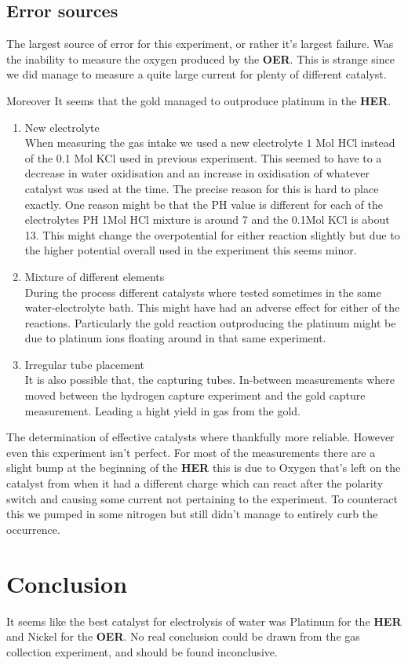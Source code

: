 \documentclass[twocolumn, floatfix]{revtex4-2}
\begin{document}
\subsection{Error sources}
The largest source of error for this experiment, or rather it's largest failure. Was 
the inability to measure the oxygen produced by the \textbf{OER}. This is strange 
since we did manage to measure a quite large current for plenty of different catalyst.
\par
Moreover It seems that the gold managed to outproduce platinum in the \textbf{HER}.
\begin{enumerate}
	\item New electrolyte \\
		When measuring the gas intake we used a new electrolyte $1$ Mol HCl instead of the
		0.1 Mol KCl used in previous experiment. This seemed to have to a decrease in water oxidisation
		and an increase in oxidisation of whatever catalyst was used at the time. The precise
		reason for this is hard to place exactly. One reason might be that the PH value is 
		different for each of the electrolytes PH 1Mol HCl mixture is around 7 and the 0.1Mol KCl
		is about 13. This might change the overpotential for either reaction slightly but due 
		to the higher potential overall used in the experiment this seems minor.
	\item Mixture of different elements \\
		During the process different catalysts where tested sometimes in the same 
		water-electrolyte bath. This might have had an adverse effect for either of 
		the reactions. Particularly the gold reaction outproducing the platinum might
		be due to platinum ions floating around in that same experiment.
	\item Irregular tube placement\\
		It is also possible that, the capturing tubes. In-between measurements where moved
		between the hydrogen capture experiment and the gold capture measurement. Leading 
		a hight yield in gas from the gold.
\end{enumerate}

The determination of effective catalysts where thankfully more reliable. However even this experiment
isn't perfect. 
For most of the measurements there are a slight bump at the beginning of the \textbf{HER} this is due to
Oxygen that's left on the catalyst from when it had a different charge which can react after the polarity
switch and causing some current not pertaining to the experiment. To counteract this we pumped in some 
nitrogen but still didn't manage to entirely curb the occurrence.
\section{Conclusion}
It seems like the best catalyst for electrolysis of water was Platinum for the \textbf{HER} and
Nickel for the \textbf{OER}. No real conclusion could be drawn from the gas collection experiment,
and should be found inconclusive.

\end{document}
